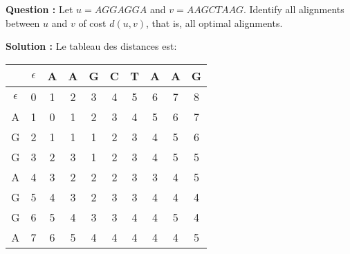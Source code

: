 \documentclass[11pt]{article} %
\newenvironment{question}[1][\unskip]{%
	\par
	\noindent
	\textbf{Question #1:}
	\noindent}
{\medskip}
\newenvironment{solution}[1][\unskip]{%
	\par
	\noindent
	\textbf{Solution #1:}
	\noindent}
{\medskip}
\begin{document}
	\section{}
	\begin{question}
		Let $u=AGGAGGA$ and $v=AAGCTAAG$. Identify all alignments between $ u $ and $ v $ of cost $ d (u, v) $, that is, all optimal alignments.
	\end{question}
	\begin{solution}
		Le tableau des distances est:
		
		\begin{center}
			\begin{tabular}{|c|c|c|c|c|c|c|c|c|c|}
				\hline
				& $\epsilon$ & A & A & G & C & T & A & A & G \\
				\hline
				$\epsilon$ &0&1&2&3&4&5&6&7&8\\
				\hline
				A&1&0&1&2&3&4&5&6&7\\
				\hline
				G&2&1&1&1&2&3&4&5&6\\
				\hline
				G&3&2&3&1&2&3&4&5&5\\
				\hline
				A&4&3&2&2&2&3&3&4&5\\
				\hline
				G&5&4&3&2&3&3&4&4&4\\
				\hline
				G&6&5&4&3&3&4&4&5&4\\
				\hline
				A&7&6&5&4&4&4&4&4&5\\
				\hline
			\end{tabular}
		\end{center}
		

\end{solution}
\end{document}
